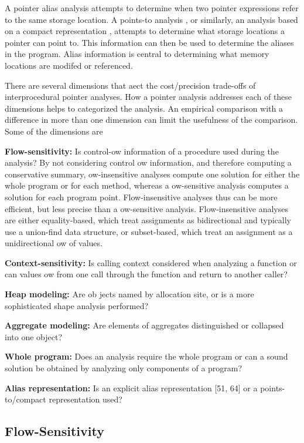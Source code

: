 A pointer alias analysis attempts to determine when two pointer expressions refer to the same storage location. A
points-to analysis , or similarly, an analysis based
on a compact representation , attempts to determine what storage locations a pointer can point to. This
information can then be used to determine the aliases in the program. Alias information is central to determining what
memory locations are modifed or referenced.

There are several dimensions that aect the cost/precision
trade-offs of interprocedural pointer analyses. How a pointer
analysis addresses each of these dimensions helps to categorized the analysis. An empirical comparison with a
difference in more than one dimension can limit the usefulness of
the comparison. Some of the dimensions are

\textbf{ Flow-sensitivity:} Is control-ow information of a procedure used during the analysis? By not considering control
ow information, and therefore computing a conservative
summary, ow-insensitive analyses compute one solution for
either the whole program or for each method, whereas a ow-sensitive analysis computes a solution for each program point.
Flow-insensitive analyses thus can be more efficient, but less precise than a ow-sensitive analysis. Flow-insensitive analyses
are either equality-based, which treat assignments as bidirectional and typically use a union-find data structure,
or subset-based, which treat an assignment as
a unidirectional ow of values.

\textbf{ Context-sensitivity:} Is calling context considered when
analyzing a function or can values ow from one call through
the function and return to another caller?

\textbf{ Heap modeling:} Are ob jects named by allocation site,
or is a more sophisticated shape analysis performed?

\textbf{ Aggregate modeling:} Are elements of aggregates distinguished or collapsed into one object?

\textbf{ Whole program:} Does an analysis require the whole
program or can a sound solution be obtained by analyzing
only components of a program?

\textbf{ Alias representation:} Is an explicit alias representation [51, 64] or a points-to/compact representation used?


\subsection{Flow-Sensitivity}


